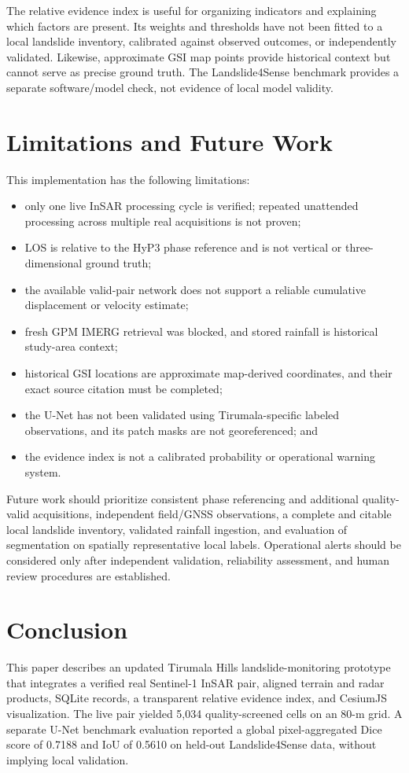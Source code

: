 \documentclass[conference]{IEEEtran}
\begin{document}
The relative evidence index is useful for organizing indicators and
explaining which factors are present. Its weights and thresholds have not
been fitted to a local landslide inventory, calibrated against observed
outcomes, or independently validated. Likewise, approximate GSI map points
provide historical context but cannot serve as precise ground truth. The
Landslide4Sense benchmark provides a separate software/model check, not
evidence of local model validity.

\section{Limitations and Future Work}
This implementation has the following limitations:
\begin{itemize}
    \item only one live InSAR processing cycle is verified; repeated
    unattended processing across multiple real acquisitions is not proven;
    \item LOS is relative to the HyP3 phase reference and is not vertical or
    three-dimensional ground truth;
    \item the available valid-pair network does not support a reliable
    cumulative displacement or velocity estimate;
    \item fresh GPM IMERG retrieval was blocked, and stored rainfall is
    historical study-area context;
    \item historical GSI locations are approximate map-derived coordinates,
    and their exact source citation must be completed;
    \item the U-Net has not been validated using Tirumala-specific labeled
    observations, and its patch masks are not georeferenced; and
    \item the evidence index is not a calibrated probability or operational
    warning system.
\end{itemize}

Future work should prioritize consistent phase referencing and additional
quality-valid acquisitions, independent field/GNSS observations, a complete
and citable local landslide inventory, validated rainfall ingestion, and
evaluation of segmentation on spatially representative local labels.
Operational alerts should be considered only after independent validation,
reliability assessment, and human review procedures are established.

\section{Conclusion}
This paper describes an updated Tirumala Hills landslide-monitoring
prototype that integrates a verified real Sentinel-1 InSAR pair, aligned
terrain and radar products, SQLite records, a transparent relative evidence
index, and CesiumJS visualization. The live pair yielded 5,034
quality-screened cells on an 80-m grid. A separate U-Net benchmark evaluation
reported a global pixel-aggregated Dice score of 0.7188 and IoU of 0.5610 on
held-out Landslide4Sense data, without implying local validation.
\end{document}
